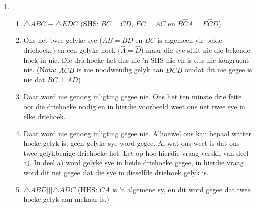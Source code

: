 \begin{solutions}{}
{\begin{enumerate}[itemsep=5pt, label=\textbf{\arabic*}. ]
\begin{enumerate}[noitemsep, label=\textbf{(\alph*)} ]
\item Van die stelling van Pythagoras:\\
$x^2 = 15^2 - 9^2\\
x=\sqrt{144}
x=12$ eenhede \\
En\\
$y^2 = x^2+5^2\\
y^2=144+25\\
y=\sqrt{169}\\
y=13$ eenhede
      \end{enumerate}
\item %
      \begin{enumerate}[itemsep=3pt, label=\textbf{(\alph*)} ]
      \item 
$\triangle ABC \equiv \triangle EDC$ (SHS: $BC=CD$, $EC=AC$ en $B\hat{C}A = E\hat{C}D$)
      \item Ons het twee gelyke sye ($AB = BD$ en $BC$ is algemeen vir beide driehoeke) en een gelyke hoek ($\hat{A} = \hat{D}$) maar die sye sluit nie die bekende hoek in nie. Die driehoeke het dus nie 'n SHS nie en is dus nie kongruent nie. (Nota: $A\hat{C}B$ is nie noodwendig gelyk aan $D\hat{C}B$ omdat dit nie gegee is nie dat $BC \perp AD$)
      \item Daar word nie genoeg inligting gegee nie. Ons het ten minste drie feite oor die driehoeke nodig en in hierdie voorbeeld weet ons net twee sye in elke driehoek.

 

\item Daar word nie genoeg inligting gegee nie. Alhoewel ons kan bepaal watter hoeke gelyk is, geen gelyke sye word gegee. Al wat ons weet is dat ons twee gelykbenige driehoeke het. Let op hoe hierdie vraag verskil van deel a). In deel a) word gelyke sye in beide driehoeke gegee, in hierdie vraag word  dit net gegee dat die sye in dieselfde driehoek gelyk is.
      \item $\triangle ABD ||| \triangle ADC$ (HHS: $CA$ is 'n algemene sy, en dit word gegee dat twee hoeke gelyk aan mekaar is.)
      \end{enumerate}
\end{enumerate}}
\end{solutions}


